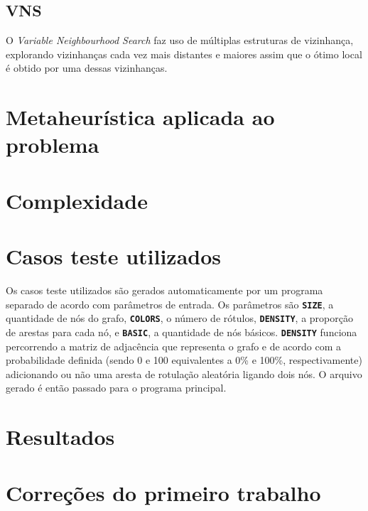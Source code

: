 \documentclass[12pt, a4paper]{article}
\newcommand{\ic}[1]{\textbf{\lstinline{#1}}}
\begin{document}
\subsection{VNS}
O \emph{Variable Neighbourhood Search} faz uso de múltiplas estruturas de
vizinhança, explorando vizinhanças cada vez mais distantes e maiores assim que
o ótimo local é obtido por uma dessas vizinhanças. 

\section{Metaheurística aplicada ao problema}

\section{Complexidade}

\section{Casos teste utilizados}
Os casos teste utilizados são gerados automaticamente por um programa separado
de acordo com parâmetros de entrada. Os parâmetros são \ic{SIZE}, a quantidade
de nós do grafo, \ic{COLORS}, o número de rótulos, \ic{DENSITY}, a proporção de
arestas para cada nó, e \ic{BASIC}, a quantidade de nós básicos. \ic{DENSITY}
funciona percorrendo a matriz de adjacência que representa o grafo e de acordo
com a probabilidade definida (sendo 0 e 100 equivalentes a 0\% e 100\%,
respectivamente) adicionando ou não uma aresta de rotulação aleatória ligando
dois nós. O arquivo gerado é então passado para o programa principal.

\section{Resultados}

\section{Correções do primeiro trabalho}
\end{document}
